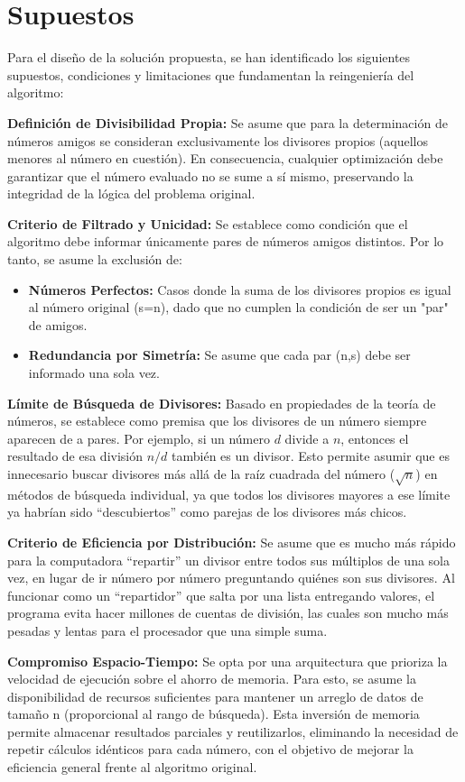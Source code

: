 \section{Supuestos}
Para el diseño de la solución propuesta, se han identificado los siguientes supuestos, condiciones y limitaciones que fundamentan la reingeniería del algoritmo:

\textbf{Definición de Divisibilidad Propia:} Se asume que para la determinación de números amigos se consideran exclusivamente los divisores propios (aquellos menores al número en cuestión). En consecuencia, cualquier optimización debe garantizar que el número evaluado no se sume a sí mismo, preservando la integridad de la lógica del problema original.

\textbf{Criterio de Filtrado y Unicidad:} Se establece como condición que el algoritmo debe informar
únicamente pares de números amigos distintos. Por lo tanto, se asume la exclusión de:
\begin{itemize}
	\item \textbf{Números Perfectos:} Casos donde la suma de los divisores propios es igual al número original (s=n), dado que no cumplen la condición de ser un "par" de amigos.
	\item \textbf{Redundancia por Simetría:} Se asume que cada par (n,s) debe ser informado una sola vez.
\end{itemize}

\textbf{Límite de Búsqueda de Divisores:} Basado en propiedades de la teoría de números, se establece como premisa que los divisores de un número siempre aparecen de a pares. Por ejemplo, si un número $d$ divide a $n$, entonces el resultado de esa división $n/d$ también es un divisor. Esto permite asumir que es innecesario buscar divisores más allá de la raíz cuadrada del número ($\sqrt{n}$) en métodos de búsqueda individual, ya que todos los divisores mayores a ese límite ya habrían sido ``descubiertos'' como parejas de los divisores más chicos.

\textbf{Criterio de Eficiencia por Distribución:} Se asume que es mucho más rápido para la computadora ``repartir'' un divisor entre todos sus múltiplos de una sola vez, en lugar de ir número por número preguntando quiénes son sus divisores. Al funcionar como un ``repartidor'' que salta por una lista entregando valores, el programa evita hacer millones de cuentas de división, las cuales son mucho más pesadas y lentas para el procesador que una simple suma.

\textbf{Compromiso Espacio-Tiempo:} Se opta por una arquitectura que prioriza la velocidad de ejecución sobre el ahorro de memoria. Para esto, se asume la disponibilidad de recursos suficientes para mantener un arreglo de datos de tamaño n (proporcional al rango de búsqueda). Esta inversión de memoria permite almacenar resultados parciales y reutilizarlos, eliminando la necesidad de repetir cálculos idénticos para cada número, con el objetivo de mejorar la eficiencia general frente al algoritmo original.

